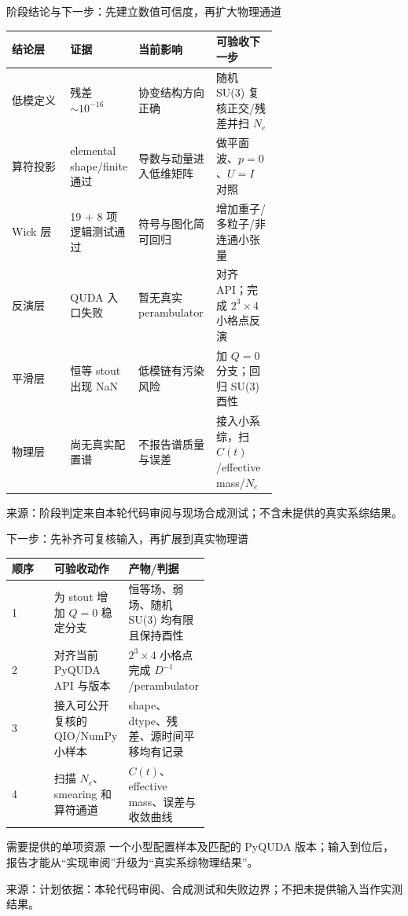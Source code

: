 \documentclass[UTF8,aspectratio=169,11pt]{ctexbeamer}
\newcommand{\source}[1]{%
  \vspace{0.06em}\par{\raggedright\scriptsize\color{muted}来源：#1\par}}
\begin{document}
\begin{frame}[t]{阶段结论与下一步：先建立数值可信度，再扩大物理通道}
  \centering
  \small
  \begin{tabularx}{0.96\linewidth}{@{}L{0.22\linewidth}L{0.22\linewidth}Y L{0.23\linewidth}@{}}
    \toprule
    结论层 & 证据 & 当前影响 & 可验收下一步 \\
    \midrule
    低模定义 & 残差 $\sim10^{-16}$ & 协变结构方向正确 & 随机 SU(3) 复核正交/残差并扫 $N_e$ \\
    算符投影 & elemental shape/finite 通过 & 导数与动量进入低维矩阵 & 做平面波、$p=0$、$U=I$ 对照 \\
    Wick 层 & 19 + 8 项逻辑测试通过 & 符号与图化简可回归 & 增加重子/多粒子/非连通小张量 \\
    反演层 & QUDA 入口失败 & 暂无真实 perambulator & 对齐 API；完成 $2^3\times4$ 小格点反演 \\
    平滑层 & 恒等 stout 出现 NaN & 低模链有污染风险 & 加 $Q=0$ 分支；回归 SU(3) 酉性 \\
    物理层 & 尚无真实配置谱 & 不报告谱质量与误差 & 接入小系综，扫 $C(t)$/effective mass/$N_e$ \\
    \bottomrule
  \end{tabularx}
  \source{阶段判定来自本轮代码审阅与现场合成测试；不含未提供的真实系综结果。}
\end{frame}

\begin{frame}[t]{下一步：先补齐可复核输入，再扩展到真实物理谱}
  \centering
  \small
  \begin{tabularx}{0.92\linewidth}{@{}L{0.24\linewidth}Y L{0.26\linewidth}@{}}
    \toprule
    顺序 & 可验收动作 & 产物/判据 \\
     & 为 stout 增加 $Q=0$ 稳定分支 & 恒等场、弱场、随机 SU(3) 均有限且保持酉性 \\
    2 & 对齐当前 PyQUDA API 与版本 & $2^3\times4$ 小格点完成 $D^{-1}$/perambulator \\
    3 & 接入可公开复核的 QIO/NumPy 小样本 & shape、dtype、残差、源时间平移均有记录 \\
    4 & 扫描 $N_e$、smearing 和算符通道 & $C(t)$、effective mass、误差与收敛曲线 \\
    \bottomrule
  \end{tabularx}
  \vspace{0.2cm}
  \begin{alertblock}{需要提供的单项资源}
    \small
    一个小型配置样本及匹配的 PyQUDA 版本；输入到位后，报告才能从“实现审阅”升级为“真实系综物理结果”。
  \end{alertblock}
  \source{计划依据：本轮代码审阅、合成测试和失败边界；不把未提供输入当作实测结果。}
\end{frame}
\end{document}
